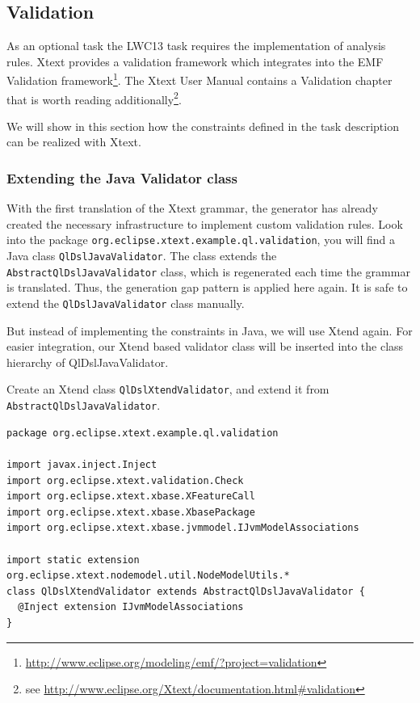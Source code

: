 \subsection{Validation}

As an optional task the LWC13 task requires the implementation of
analysis rules. Xtext provides a validation framework which integrates into the
EMF Validation
framework\footnote{\url{http://www.eclipse.org/modeling/emf/?project=validation}}.
The Xtext User Manual contains a Validation chapter that is
worth reading additionally\footnote{see
\url{http://www.eclipse.org/Xtext/documentation.html\#validation}}.

We will show in this section how the constraints defined in the task description
can be realized with Xtext.

\subsubsection{Extending the Java Validator class}
With the first translation of the Xtext grammar, the generator has already
created the necessary infrastructure to implement custom validation rules.
Look into the package \texttt{org.eclipse.xtext.example.ql.validation}, you will
find a Java class \texttt{QlDslJavaValidator}. The class extends the
\texttt{AbstractQlDslJavaValidator} class, which is regenerated each time the
grammar is translated. Thus, the generation gap pattern is applied here again.
It is safe to extend the \texttt{QlDslJavaValidator} class manually.

But instead of implementing the constraints in Java, we will use Xtend again.
For easier integration, our Xtend based validator class will be inserted into
the class hierarchy of QlDslJavaValidator.

Create an Xtend class \texttt{QlDslXtendValidator}, and extend it from
\texttt{AbstractQlDslJavaValidator}.

\begin{lstlisting}[language=Xtend]
package org.eclipse.xtext.example.ql.validation

import javax.inject.Inject
import org.eclipse.xtext.validation.Check
import org.eclipse.xtext.xbase.XFeatureCall
import org.eclipse.xtext.xbase.XbasePackage
import org.eclipse.xtext.xbase.jvmmodel.IJvmModelAssociations

import static extension org.eclipse.xtext.nodemodel.util.NodeModelUtils.*
class QlDslXtendValidator extends AbstractQlDslJavaValidator {
  @Inject extension IJvmModelAssociations
}
\end{lstlisting}

